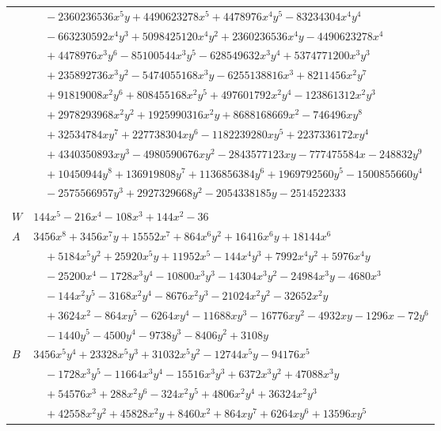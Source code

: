\documentclass[11pt]{article}
\begin{document}
\begin{longtable}{@{}ll@{}}
 & $\quad -2360236536x^{5}y+4490623278x^{5}+4478976x^{4}y^{5}-83234304x^{4}y^{4}$\\
 & $\quad -663230592x^{4}y^{3}+5098425120x^{4}y^{2}+2360236536x^{4}y-4490623278x^{4}$\\
 & $\quad +4478976x^{3}y^{6}-85100544x^{3}y^{5}-628549632x^{3}y^{4}+5374771200x^{3}y^{3}$\\
 & $\quad +235892736x^{3}y^{2}-5474055168x^{3}y-6255138816x^{3}+8211456x^{2}y^{7}$\\
 & $\quad +91819008x^{2}y^{6}+808455168x^{2}y^{5}+497601792x^{2}y^{4}-123861312x^{2}y^{3}$\\
 & $\quad +2978293968x^{2}y^{2}+1925990316x^{2}y+8688168669x^{2}-746496xy^{8}$\\
 & $\quad +32534784xy^{7}+227738304xy^{6}-1182239280xy^{5}+2237336172xy^{4}$\\
 & $\quad +4340350893xy^{3}-4980590676xy^{2}-2843577123xy-777475584x-248832y^{9}$\\
 & $\quad +10450944y^{8}+136919808y^{7}+1136856384y^{6}+1969792560y^{5}-1500855660y^{4}$\\
 & $\quad -2575566957y^{3}+2927329668y^{2}-2054338185y-2514522333$\\
\addlinespace[3pt]
\multicolumn{2}{@{}l}{$i=26$, $m=9$, neighbours $116,8,11,39,57,75,76,81$}\\
$W$ & $144x^{5}-216x^{4}-108x^{3}+144x^{2}-36$\\
$A$ & $3456x^{8}+3456x^{7}y+15552x^{7}+864x^{6}y^{2}+16416x^{6}y+18144x^{6}$\\
 & $\quad +5184x^{5}y^{2}+25920x^{5}y+11952x^{5}-144x^{4}y^{3}+7992x^{4}y^{2}+5976x^{4}y$\\
 & $\quad -25200x^{4}-1728x^{3}y^{4}-10800x^{3}y^{3}-14304x^{3}y^{2}-24984x^{3}y-4680x^{3}$\\
 & $\quad -144x^{2}y^{5}-3168x^{2}y^{4}-8676x^{2}y^{3}-21024x^{2}y^{2}-32652x^{2}y$\\
 & $\quad +3624x^{2}-864xy^{5}-6264xy^{4}-11688xy^{3}-16776xy^{2}-4932xy-1296x-72y^{6}$\\
 & $\quad -1440y^{5}-4500y^{4}-9738y^{3}-8406y^{2}+3108y$\\
$B$ & $3456x^{5}y^{4}+23328x^{5}y^{3}+31032x^{5}y^{2}-12744x^{5}y-94176x^{5}$\\
 & $\quad -1728x^{3}y^{5}-11664x^{3}y^{4}-15516x^{3}y^{3}+6372x^{3}y^{2}+47088x^{3}y$\\
 & $\quad +54576x^{3}+288x^{2}y^{6}-324x^{2}y^{5}+4806x^{2}y^{4}+36324x^{2}y^{3}$\\
 & $\quad +42558x^{2}y^{2}+45828x^{2}y+8460x^{2}+864xy^{7}+6264xy^{6}+13596xy^{5}$\\

\end{longtable}
\end{document}
